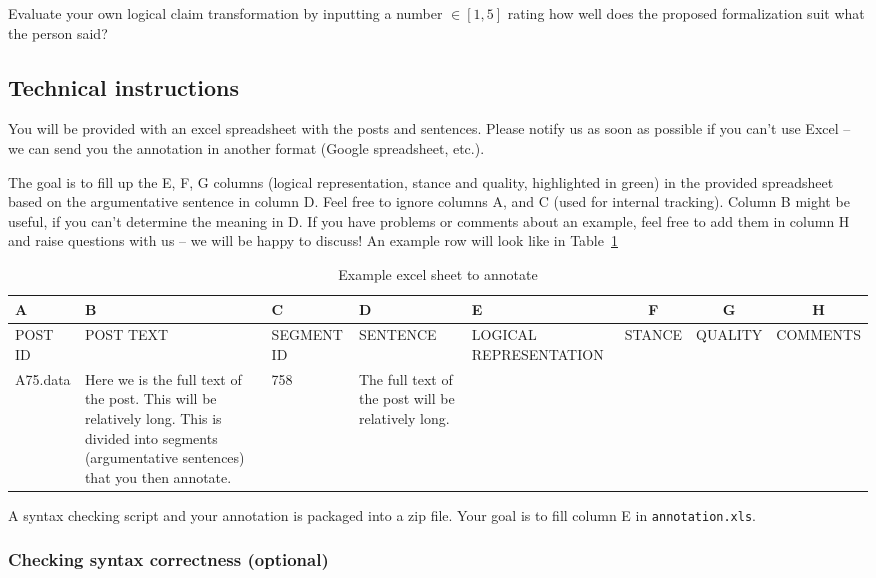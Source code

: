 Evaluate your own logical claim transformation by inputting a number $\in [1, 5]$
rating how well does the proposed formalization suit what the person said?

\subsection*{Technical instructions}

You will be provided with an excel spreadsheet with the posts and sentences.
Please notify us as soon as possible if you can’t use Excel -- we can send you
the annotation in another format (Google spreadsheet, etc.). 

The goal is to fill up the E, F, G columns (logical representation, stance and
quality, highlighted in green) in the provided spreadsheet based on the
argumentative sentence in column D. Feel free to ignore columns A, and C (used
for internal tracking). Column B might be useful, if you can’t determine the
meaning in D. If you have problems or comments about an example, feel free to
add them in column H and raise questions with us -- we will be happy to
discuss! An example row will look like in Table~\ref{tab:annotation_example}

\begin{table}[!htb]
\scriptsize
\begin{tabular}{|p{1.5cm} | p{2cm} | p{2cm} | p{2cm} | p{2cm} |c| c| c|}
\toprule
A & B & C & D & E & F & G & H \\
\midrule
POST ID & POST TEXT & SEGMENT ID & SENTENCE & LOGICAL REPRESENTATION
& STANCE & QUALITY & COMMENTS \\
\midrule
A75.data & 
Here we is the full text of the post. This will be relatively long.
This is divided into segments (argumentative sentences) that you then annotate. 
& 758 & 
The full text of the post will be relatively long.  
& \cellcolor{green!25} &  \cellcolor{green!25}& \cellcolor{green!25} & \cellcolor{green!25} \\
\bottomrule
\end{tabular}
\caption{Example excel sheet to annotate}
\label{tab:annotation_example}
\end{table}

A syntax checking script and your annotation is packaged into a zip file.  Your goal is to
fill column E in \texttt{annotation.xls}.

\subsubsection*{Checking syntax correctness (optional)}

